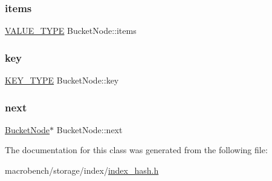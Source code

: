 \subsubsection{\texorpdfstring{items}{items}}
{\footnotesize\ttfamily \hyperlink{microbench_2main_8cpp_ae17cb099b4c9aee7835032339b5a9e0d}{V\+A\+L\+U\+E\+\_\+\+T\+Y\+PE} Bucket\+Node\+::items}

\mbox{\label{classBucketNode_ae9416fe7ade549b23efc88d413e61de2}} 
\subsubsection{\texorpdfstring{key}{key}}
{\footnotesize\ttfamily \hyperlink{index__base_8h_ae35c40bc2f912c11f0e36ac66cba4489}{K\+E\+Y\+\_\+\+T\+Y\+PE} Bucket\+Node\+::key}

\mbox{\label{classBucketNode_a5c641909c96ba75324518fafa9166c61}} 
\subsubsection{\texorpdfstring{next}{next}}
{\footnotesize\ttfamily \hyperlink{classBucketNode}{Bucket\+Node}$\ast$ Bucket\+Node\+::next}



The documentation for this class was generated from the following file\+:\begin{DoxyCompactItemize}
\item 
macrobench/storage/index/\hyperlink{index__hash_8h}{index\+\_\+hash.\+h}\end{DoxyCompactItemize}
